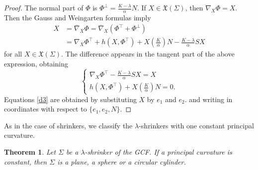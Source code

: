\documentclass[a4paper,12pt]{amsart}
\newtheorem{theorem}{Theorem}[section]
\theoremstyle{definition}
\begin{document}
\begin{proof} The normal part of $\Phi$ is   $\Phi^{\perp}=\frac{K-\lambda}{\alpha}N$. If $X\in\mathfrak{X}(\Sigma)$, then   $\nabla_X\Phi=X$. Then the Gauss and
Weingarten formulas imply 
\begin{equation*}
\begin{split}
    X&=\overline{\nabla}_{X}\Phi=\overline{\nabla}_{X}(\Phi^{\top}+\Phi^{\perp})\\
    &={\nabla}_{X}\Phi^{\top}+h(X,\Phi^{\top})+X(\frac{K}{\alpha})N-\frac{K-\lambda}{\alpha}SX 
\end{split}
\end{equation*}
for all   $X\in\mathfrak{X}(\Sigma)$.
The difference appears in the tangent part of the above expression, obtaining  
\begin{equation*} 
    \left\{
    \begin{array}{ll}
        {\nabla}_{X}\Phi^{\top}-\frac{K-\lambda}{\alpha}SX=X\\
        h(X, \Phi^{\top})+X(\frac{K}{\alpha})N=0.
    \end{array}
    \right.
\end{equation*}
Equations \eqref{d3} are obtained by substituting $X$ by $e_1$ and   $e_2$. and writing in coordinates with respect to $\{e_1,e_2,N\}$. 
\end{proof}
 
As in the case of shrinkers, we classify the $\lambda$-shrinkers with one constant principal curvature.  
 
\begin{theorem}\label{t-d} Let $\Sigma$ be a $\lambda$-shrinker of the GCF. If a principal curvature is constant, then $\Sigma$ is a plane, a sphere or a circular cylinder. 
\end{theorem}
\end{document}
